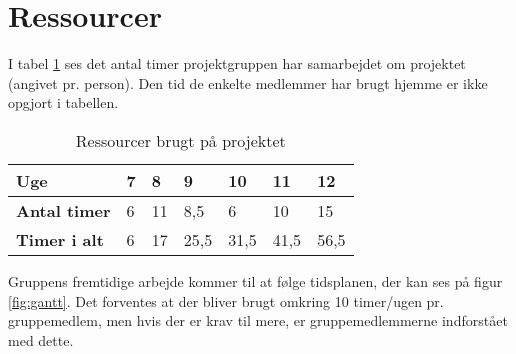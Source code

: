 \section{Ressourcer}
I tabel \ref{table:ressourcer} ses det antal timer projektgruppen har samarbejdet om projektet (angivet pr. person). Den tid de enkelte medlemmer har brugt hjemme er ikke opgjort i tabellen.

\begin{table}[h]
    \centering
    \begin{tabular}{|p{3cm}|p{1cm}|p{1cm}|p{1cm}|p{1cm}|p{1cm}|p{1cm}|} 
        \hline
        \textbf{Uge}         & \textbf{7} & \textbf{8} & \textbf{9} & \textbf{10} & \textbf{11} & \textbf{12}   \\ 
        \hline
        \textbf{Antal timer} & 6          & 11         & 8,5        & 6           & 10          & 15            \\ 
        \hline
        \textbf{Timer i alt} & 6          & 17         & 25,5       & 31,5        & 41,5        & 56,5          \\
        \hline
    \end{tabular}
    \caption{Ressourcer brugt på projektet}
    \label{table:ressourcer}
\end{table}

\noindent
Gruppens fremtidige arbejde kommer til at følge tidsplanen, der kan ses på figur \ref{fig:gantt}. Det forventes at der bliver brugt omkring 10 timer/ugen pr. gruppemedlem, men hvis der er krav til mere, er gruppemedlemmerne indforstået med dette.